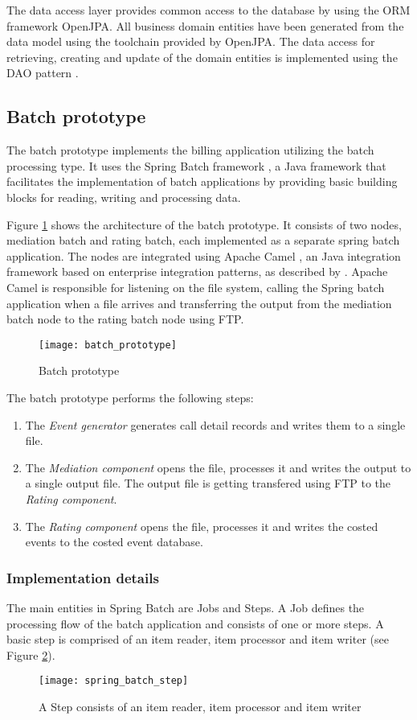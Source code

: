 The data access layer provides common access to the database by using the \ac{ORM} framework OpenJPA. All business domain entities have been generated from the data model using the toolchain provided by OpenJPA. The data access for retrieving, creating and update of the domain entities is implemented using the DAO pattern \citep{Alur:2003:CJP:863711}.

\subsection{Batch prototype}
The batch prototype implements the billing application utilizing the batch processing type. It uses the Spring Batch framework \citep{springbatch}, a Java framework that facilitates the implementation of batch applications by providing basic building blocks for reading, writing and processing data.

Figure \ref{fig:ch4_batch_prototype} shows the architecture of the batch prototype. It consists of two nodes, mediation batch and rating batch, each implemented as a separate spring batch application. The nodes are integrated using Apache Camel \citep{apachecamel}, an Java integration framework based on enterprise integration patterns, as described by \cite{Hohpe:2003fk}. Apache Camel is responsible for listening on the file system, calling the Spring batch application when a file arrives and transferring the output from the mediation batch node to the rating batch node using \ac{FTP}.

\begin{figure}[htbp]
	\centering
	\texttt{[image: batch\_prototype]}
	\caption{Batch prototype}
	\label{fig:ch4_batch_prototype}
\end{figure}

The batch prototype performs the following steps:
\begin{enumerate}
	\item The \emph{Event generator} generates call detail records and writes them to a single file.
	\item The \emph{Mediation component} opens the file, processes it and writes the output to a single output file. The output file is getting transfered using \ac{FTP} to the \emph{Rating component}.
	\item The \emph{Rating component} opens the file, processes it and writes the costed events to the costed event database.
\end{enumerate}

\subsubsection{Implementation details}
The main entities in Spring Batch are Jobs and Steps. A Job defines the processing flow of the batch application and consists of one or more steps. A basic step is comprised of an item reader, item processor and item writer (see Figure \ref{fig:ch4_spring_batch_step}). 
\begin{figure}[htbp]
	\centering
	\texttt{[image: spring\_batch\_step]}
	\caption{A Step consists of an item reader, item processor and item writer}
	\label{fig:ch4_spring_batch_step}
\end{figure}

